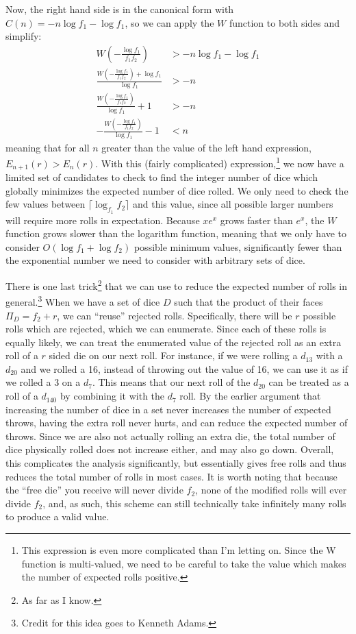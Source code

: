 \documentclass{article}
\begin{document}
Now, the right hand side is in the canonical form with $C(n) = -n\log{f_1}-\log{f_1}$, so we can apply the $W$ function to both sides and simplify:
\begin{align}
    W\left(-\frac{\log{f_1}}{f_1f_2}\right) &> -n\log{f_1}-\log{f_1}\\
    \frac{W\left(-\frac{\log{f_1}}{f_1f_2}\right) + \log{f_1}}{\log{f_1}} &> -n\\
    \frac{W\left(-\frac{\log{f_1}}{f_1f_2}\right)}{\log{f_1}} + 1 &> -n\\
    -\frac{W\left(-\frac{\log{f_1}}{f_1f_2}\right)}{\log{f_1}} - 1 &< n
\end{align}
meaning that for all $n$ greater than the value of the left hand expression, $E_{n+1}(r) > E_n(r)$.
With this (fairly complicated) expression,\footnote{This expression is even more complicated than I'm letting on. Since the W function is multi-valued, we need to be careful to take the value which makes the number of expected rolls positive.} we now have a limited set of candidates to check to find the integer number of dice which globally minimizes the expected number of dice rolled.
We only need to check the few values between $\lceil \log_{f_1}{f_2} \rceil$ and this value, since all possible larger numbers will require more rolls in expectation.
Because $xe^x$ grows faster than $e^x$, the $W$ function grows slower than the logarithm function, meaning that we only have to consider $O(\log{f_1} + \log{f_2})$ possible minimum values, significantly fewer than the exponential number we need to consider with arbitrary sets of dice.

\par There is one last trick\footnote{As far as I know.} that we can use to reduce the expected number of rolls in general.\footnote{Credit for this idea goes to Kenneth Adams.}
When we have a set of dice $D$ such that the product of their faces $\Pi_D = f_2 + r$, we can ``reuse'' rejected rolls.
Specifically, there will be $r$ possible rolls which are rejected, which we can enumerate.
Since each of these rolls is equally likely, we can treat the enumerated value of the rejected roll as an extra roll of a $r$ sided die on our next roll.
For instance, if we were rolling a $d_{13}$ with a $d_{20}$ and we rolled a 16, instead of throwing out the value of 16, we can use it as if we rolled a 3 on a $d_{7}$.
This means that our next roll of the $d_{20}$ can be treated as a roll of a $d_{140}$ by combining it with the $d_{7}$ roll.
By the earlier argument that increasing the number of dice in a set never increases the number of expected throws, having the extra roll never hurts, and can reduce the expected number of throws.
Since we are also not actually rolling an extra die, the total number of dice physically rolled does not increase either, and may also go down.
Overall, this complicates the analysis significantly, but essentially gives free rolls and thus reduces the total number of rolls in most cases.
It is worth noting that because the ``free die'' you receive will never divide $f_2$, none of the modified rolls will ever divide $f_2$, and, as such, this scheme can still technically take infinitely many rolls to produce a valid value.
\end{document}
